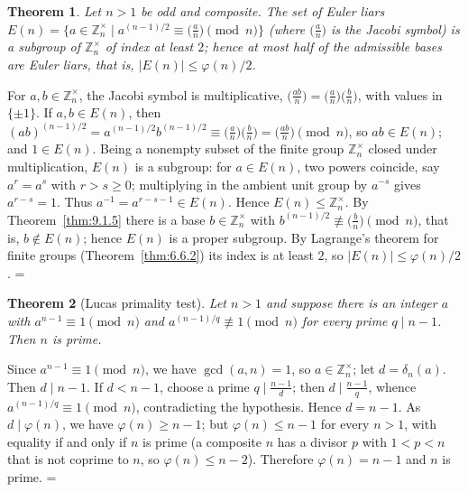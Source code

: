 \documentclass[11pt]{article}
\makeatletter
\let\nt@closedisplay\]
\def\nt@guardedclose{\@ifnextchar\par{\nt@closeafterpar}{\@ifnextchar\end{\postdisplaypenalty\@M\nt@closedisplay}{\nt@closedisplay}}}
\def\nt@closeafterpar\par{\@ifnextchar\par{\nt@closeafterpar}{\@ifnextchar\end{\postdisplaypenalty\@M\nt@closedisplay\par}{\nt@closedisplay\par}}}
\renewenvironment{proof}[1][\proofname]{\par
  \pushQED{\qed}\normalfont\topsep\medskipamount\edef\nt@afterproof{\@endparpenalty=\the\@endparpenalty\relax}\@beginparpenalty\@M\@endparpenalty\@M\let\]\nt@guardedclose\trivlist\item[]\textit{#1\@addpunct{.}} \ignorespaces}{\ifvmode\addpenalty\@M\fi\popQED\nt@afterproof\endtrivlist\@endpefalse}
\theoremstyle{ntstyle}
\newtheorem{theorem}{Theorem}[subsection]
\newcommand{\legs}[2]{\bigl(\tfrac{#1}{#2}\bigr)}
\newcommand{\ZmodUnits}[1]{\mathbb{Z}_{#1}^{\times}}
\makeatother
\begin{document}
\begin{theorem}\label{thm:9.1.7} Let
  $n>1$ be odd and composite. The set of Euler liars
  $E(n)=\{a\in\ZmodUnits{n} \mid a^{(n-1)/2}\equiv\legs{a}{n}\pmod{n}\}$ (where $\legs{a}{n}$ is the Jacobi
  symbol) is a subgroup of $\ZmodUnits{n}$ of index at least
  $2$; hence at most half of the admissible bases are Euler liars, that is, $|E(n)|\le\varphi(n)/2$.

\end{theorem}

\begin{proof} For $a,b\in\ZmodUnits{n}$, the
  Jacobi symbol is multiplicative,
  $\legs{ab}{n}=\legs{a}{n}\legs{b}{n}$, with values in $\{\pm1\}$. If $a,b\in E(n)$, then
  $(ab)^{(n-1)/2}=a^{(n-1)/2}b^{(n-1)/2}\equiv\legs{a}{n}\legs{b}{n}=\legs{ab}{n}\pmod{n}$, so
  $ab\in E(n)$; and $1\in E(n)$. Being a nonempty subset of the finite group $\ZmodUnits{n}$ closed under
  multiplication, $E(n)$ is a subgroup: for $a\in E(n)$, two powers coincide, say $a^r=a^s$ with $r>s\ge0$;
  multiplying in the ambient unit group by $a^{-s}$ gives $a^{r-s}=1$. Thus $a^{-1}=a^{r-s-1}\in E(n)$. Hence
  $E(n)\le\ZmodUnits{n}$. By Theorem~\ref{thm:9.1.5} there is a base
  $b\in\ZmodUnits{n}$ with $b^{(n-1)/2}\not\equiv\legs{b}{n}\pmod{n}$, that is, $b\notin E(n)$; hence $E(n)$ is a proper
  subgroup. By Lagrange's theorem for finite groups (Theorem~\ref{thm:6.6.2}) its index is at least $2$, so
  $|E(n)|\le\varphi(n)/2$.
\end{proof}

\begin{theorem}[Lucas primality test]\label{thm:9.1.8}\label{thm:lucas-primality-test}
  Let $n>1$
  and suppose there is an integer $a$ with $a^{n-1}\equiv1\pmod{n}$ and
  $a^{(n-1)/q}\not\equiv1\pmod{n}$ for every prime $q\mid n-1$. Then $n$ is prime.

\end{theorem}

\begin{proof} Since $a^{n-1}\equiv1\pmod{n}$,
  we have $\gcd(a, n)=1$, so $a\in\ZmodUnits{n}$; let
  $d=\delta_n(a)$. Then $d\mid n-1$. If $d<n-1$, choose a
  prime $q\mid\tfrac{n-1}{d}$; then $d\mid\tfrac{n-1}{q}$, whence
  $a^{(n-1)/q}\equiv1\pmod{n}$, contradicting the hypothesis. Hence
  $d=n-1$. As $d\mid\varphi(n)$, we have $\varphi(n)\ge n-1$; but $\varphi(n)\le n-1$ for every $n>1$, with
  equality if and only if $n$ is prime (a composite $n$ has a divisor $p$ with $1<p<n$ that is not coprime to $n$,
  so $\varphi(n)\le n-2$). Therefore $\varphi(n)=n-1$ and $n$ is prime.
\end{proof}
\end{document}
